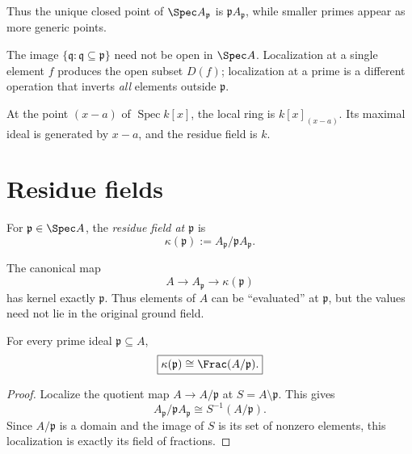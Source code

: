 Thus the unique closed point of $\Spec A_{\mathfrak p}$ is
$\mathfrak pA_{\mathfrak p}$, while smaller primes appear as more generic points.



\begin{remark}
The image $\{\mathfrak q:\mathfrak q\subseteq\mathfrak p\}$ need not be open in
$\Spec A$.  Localization at a single element $f$ produces the open subset $D(f)$;
localization at a prime is a different operation that inverts \emph{all} elements outside
$\mathfrak p$.
\end{remark}

\begin{example}\label{ex:vi11-expand-01}
At the point $(x-a)$ of $\operatorname{Spec}k[x]$, the local ring is $k[x]_{(x-a)}$.  Its maximal ideal is generated by $x-a$, and the residue field is $k$.
\end{example}
\section{Residue fields}

\begin{definition}
For $\mathfrak p\in\Spec A$, the \emph{residue field at $\mathfrak p$} is
\[
\kappa(\mathfrak p)
:=A_{\mathfrak p}/\mathfrak pA_{\mathfrak p}.
\]
\end{definition}

The canonical map
\[
A\longrightarrow A_{\mathfrak p}\longrightarrow\kappa(\mathfrak p)
\]
has kernel exactly $\mathfrak p$.  Thus elements of $A$ can be ``evaluated'' at
$\mathfrak p$, but the values need not lie in the original ground field.

\begin{theorem}
For every prime ideal $\mathfrak p\subseteq A$,
\[
\boxed{
\kappa(\mathfrak p)
\cong
\Frac(A/\mathfrak p).
}
\]
\end{theorem}

\begin{proof}
Localize the quotient map $A\to A/\mathfrak p$ at $S=A\setminus\mathfrak p$.  This gives
\[
A_{\mathfrak p}/\mathfrak pA_{\mathfrak p}
\cong
S^{-1}(A/\mathfrak p).
\]
Since $A/\mathfrak p$ is a domain and the image of $S$ is its set of nonzero elements,
this localization is exactly its field of fractions.
\end{proof}

